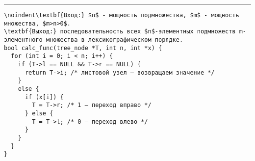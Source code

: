 \vspace{5pt} \hrule

\begin{lstlisting}[caption={Генерация $n$-элементарных подмножеств $m$-элементарного множества}, label=p138_calc_function, escapechar=`]
\noindent\textbf{Вход:} $n$ - мощность подмножества, $m$ - мощность множества, $m>n>0$.
\textbf{Выход:} последовательность всех $n$-элементных подмножеств m-элементного множества в лексикографическом порядке.
bool calc_func(tree_node *T, int n, int *x) {
  for (int i = 0; i < n; i++) {
    if (T->l == NULL && T->r == NULL) {
      return T->i; /* листовой узел — возвращаем значениe */
    }
    else {
      if (x[i]) {
        T = T->r; /* 1 — переход вправо */
      } else {
        T = T->l; /* 0 — переход влево */
      }
    }
  }
}
\end{lstlisting}
